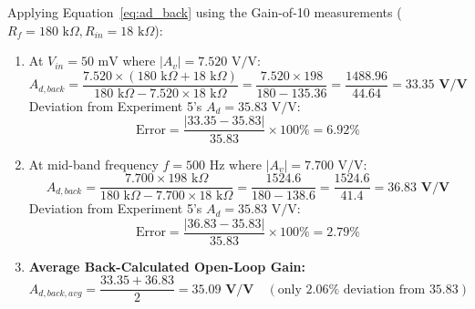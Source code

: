 \documentclass[11pt,a4paper]{article}
\begin{document}
Applying Equation~\eqref{eq:ad_back} using the Gain-of-10 measurements ($R_f = 180\text{ k}\Omega, R_{in} = 18\text{ k}\Omega$):
\begin{enumerate}
    \item At $V_{in} = 50\text{ mV}$ where $|A_v| = 7.520\text{ V/V}$:
    \begin{equation}
        A_{d,back} = \frac{7.520 \times (180\text{ k}\Omega + 18\text{ k}\Omega)}{180\text{ k}\Omega - 7.520 \times 18\text{ k}\Omega} = \frac{7.520 \times 198}{180 - 135.36} = \frac{1488.96}{44.64} = \mathbf{33.35\text{ V/V}}
    \end{equation}
    Deviation from Experiment 5's $A_d = 35.83\text{ V/V}$:
    \begin{equation}
        \text{Error} = \frac{|33.35 - 35.83|}{35.83} \times 100\% = \mathbf{6.92\%}
    \end{equation}
    \item At mid-band frequency $f = 500\text{ Hz}$ where $|A_v| = 7.700\text{ V/V}$:
    \begin{equation}
        A_{d,back} = \frac{7.700 \times 198\text{ k}\Omega}{180\text{ k}\Omega - 7.700 \times 18\text{ k}\Omega} = \frac{1524.6}{180 - 138.6} = \frac{1524.6}{41.4} = \mathbf{36.83\text{ V/V}}
    \end{equation}
    Deviation from Experiment 5's $A_d = 35.83\text{ V/V}$:
    \begin{equation}
        \text{Error} = \frac{|36.83 - 35.83|}{35.83} \times 100\% = \mathbf{2.79\%}
    \end{equation}
    \item \textbf{Average Back-Calculated Open-Loop Gain:}
    \begin{equation}
        A_{d,back,avg} = \frac{33.35 + 36.83}{2} = \mathbf{35.09\text{ V/V}} \quad (\text{only } 2.06\% \text{ deviation from } 35.83)
    \end{equation}
\end{enumerate}
\end{document}
